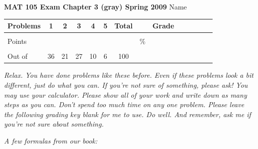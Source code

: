\documentclass[12pt]{article}
\begin{document}
{\bf MAT 105 Exam Chapter 3 (gray) Spring 2009} \hspace{.4in} {\large Name} \hrulefill

\hrulefill


\begin{center}

\begin{tabular}
{|l|c|c|c|c|c|c|c|c|c|c|c|c|c|} \hline

 Problems & \hspace{5 pt} 1 \hspace{5 pt}  & \hspace{5 pt} 2 \hspace{5 pt} & \hspace{5 pt} 3 \hspace{5 pt} & \hspace{5 pt} 4 \hspace{5 pt} & \hspace{5 pt} 5 \hspace{5 pt} &  \hspace{5 pt} Total  \hspace{5 pt} & &  \hspace{5 pt} Grade \hspace{5 pt}  \\ \hline
&&&&&& &&\\  
Points &&&&&& &    \hspace{.8in}\% &  \\ 
&&&&& &&& \\  \hline
Out of & 36  & 21 & 27 & 10 & 6 &100 & & \\ \hline

\end {tabular}
 
\end{center}

 \emph{Relax.  You have done problems like these before.  Even if these problems look a bit different, just do what you can.  If you're not sure of something, please ask! You may use your calculator.  Please show all of your work and write down as many steps as you can.  Don't spend too much time on any one problem.  Please leave the following grading key blank for me to use.  Do well.  And remember, ask me if you're not sure about something.}
 
 \vspace{.1 in}
 
 \emph{A few formulas from our book:}
  \vspace{.2in}
 
 \hrulefill
 
\end{document}
